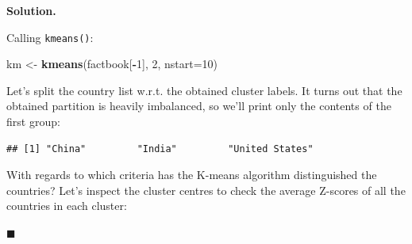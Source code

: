 \documentclass[10pt,b5paper,krantz1]{krantz}
\newenvironment{Shaded}{\begin{snugshade}}{\end{snugshade}}
\newcommand{\CommentTok}[1]{\textcolor[rgb]{0.37,0.37,0.37}{\textit{#1}}}
\newcommand{\DataTypeTok}[1]{\textcolor[rgb]{0.27,0.27,0.27}{#1}}
\newcommand{\DecValTok}[1]{\textcolor[rgb]{0.06,0.06,0.06}{#1}}
\newcommand{\KeywordTok}[1]{\textcolor[rgb]{0.27,0.27,0.27}{\textbf{#1}}}
\newcommand{\NormalTok}[1]{#1}
\newcommand{\OperatorTok}[1]{\textcolor[rgb]{0.43,0.43,0.43}{\textbf{#1}}}
\newcommand{\StringTok}[1]{\textcolor[rgb]{0.5,0.5,0.5}{#1}}
\newenvironment{solution}{%
\bigskip\noindent\textbf{Solution. }%
\it\ignorespaces%
\ignorespaces%
}{\ignorespaces%
\hfill$\blacksquare$%
}
\begin{document}
\begin{solution}

Calling \texttt{kmeans()}:

\begin{Shaded}
\begin{Highlighting}[]
\NormalTok{km <-}\StringTok{ }\KeywordTok{kmeans}\NormalTok{(factbook[}\OperatorTok{-}\DecValTok{1}\NormalTok{], }\DecValTok{2}\NormalTok{, }\DataTypeTok{nstart=}\DecValTok{10}\NormalTok{)}
\end{Highlighting}
\end{Shaded}

Let's split the country list w.r.t. the obtained cluster labels.
It turns out that the obtained partition is heavily imbalanced, so we'll
print only the contents of the first group:

\begin{Shaded}
\end{Shaded}

\begin{verbatim}
## [1] "China"         "India"         "United States"
\end{verbatim}

With regards to which criteria has the K-means algorithm distinguished
the countries? Let's inspect the cluster centres to check the average
Z-scores of all the countries in each cluster:

\begin{Shaded}
\end{Shaded}


\end{solution}
\end{document}
